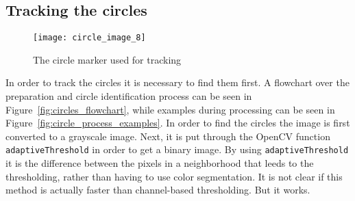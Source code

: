 \subsection{Tracking the circles}
\begin{figure}
\centering
\texttt{[image: circle\_image\_8]}
\caption{The circle marker used for tracking}
\label{fig:original_circle_marker}
\end{figure}

In order to track the circles it is necessary to find them first.
A flowchart over the preparation and circle identification process can be seen in Figure~\vref{fig:circles_flowchart},
while examples during processing can be seen in Figure~\vref{fig:circle_process_examples}.
In order to find the circles the image is first converted to a grayscale image.
Next, it is put through the OpenCV function \verb|adaptiveThreshold| in order to get a binary image.
By using \verb|adaptiveThreshold| it is the difference between the pixels in a neighborhood that leeds to the thresholding,
rather than having to use color segmentation.
It is not clear if this method is actually faster than channel-based thresholding.
But it works.



